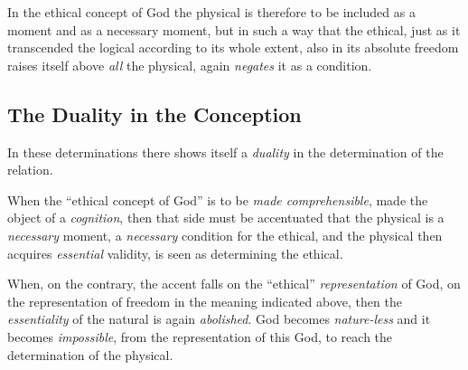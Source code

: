 \documentclass[12pt,a4paper]{book}
\begin{document}
In the ethical concept of God the physical is therefore to be included as a moment and as
a necessary moment, but in such a way that the ethical, just as it transcended the logical
according to its whole extent, also in its absolute freedom raises itself above \emph{all} the
physical, again \emph{negates} it as a condition.

\subsection{The Duality in the Conception}
\label{ssec:duality}

In these determinations there shows itself a \emph{duality} in the determination of the
relation.

When the ``ethical concept of God'' is to be \emph{made comprehensible}, made the object of a
\emph{cognition}, then that side must be accentuated that the physical is a \emph{necessary} moment,
a \emph{necessary} condition for the ethical, and the physical then acquires \emph{essential}
validity, is seen as determining the ethical.

When, on the contrary, the accent falls on the ``ethical'' \emph{representation} of God, on the
representation of freedom in the meaning indicated above, then the \emph{essentiality} of the
natural is again \emph{abolished}. God becomes \emph{nature-less} and it becomes \emph{impossible}, from the
representation of this God, to reach the determination of the physical.
\end{document}
